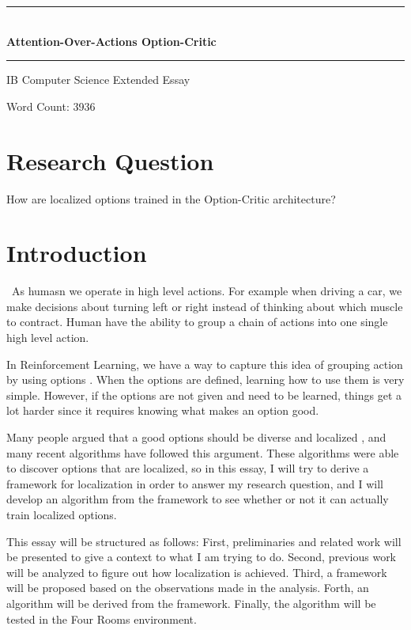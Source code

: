 \documentclass{article}
\date{}
\begin{document}
	\begin{center}
		\large{\rule{420pt}{0.4pt}}\\
		\vspace{0.15in}
		\LARGE{\bfseries{Attention-Over-Actions Option-Critic}}
		\vspace{0.1in}
		\large{\rule{420pt}{0.4pt}}
		
		\large{IB Computer Science Extended Essay}
		
		\normalsize{Word Count: 3936}
	\end{center}
	\vspace{0.1in}
	\section*{Research Question}
	How are localized options trained in the Option-Critic architecture? \\
	\vspace{0.1in}
	\section{Introduction}
	\qquad \ As humasn we operate in high level actions. For example when driving a car, we make decisions about turning left or right instead of thinking about which muscle to contract. Human have the ability to group a chain of actions into one single high level action. 
	
	\quad In Reinforcement Learning, we have a way to capture this idea of grouping action by using options \cite{SUTTON1999181}. When the options are defined, learning how to use them is very simple. However, if the options are not given and need to be learned, things get a lot harder since it requires knowing what makes an option good. 

	\quad Many people argued that a good options should be diverse and localized \cite{khetarpal2020options}\cite{attentionoptioncritic}, and many recent algorithms have followed this argument. These algorithms were able to discover options that are localized, so in this essay, I will try to derive a framework for localization in order to answer my research question, and I will develop an algorithm from the framework to see whether or not it can actually train localized options. 
	
	\quad This essay will be structured as follows: First, preliminaries and related work will be presented to give a context to what I am trying to do. Second, previous work will be analyzed to figure out how localization is achieved. Third, a framework will be proposed based on the observations made in the analysis. Forth, an algorithm will be derived from the framework. Finally, the algorithm will be tested in the Four Rooms environment.
\end{document}
